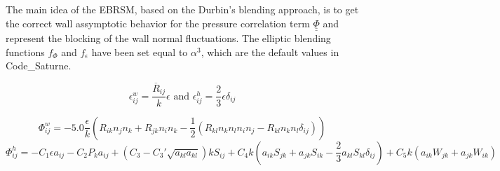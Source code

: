 \documentclass[11pt,letterpaper,english]{article}
\begin{document}
The main idea of the EBRSM, based on the Durbin's blending approach, is to get the correct wall assymptotic behavior for the pressure correlation term $\underline{\underline{\Phi}}$ and represent the blocking of the wall normal fluctuations.
The elliptic blending functions $f_{\Phi}$ and $f_{\epsilon}$\cite{manceau2015} have been set equal to $\alpha^{3}$, which are the default values in Code\_Saturne.



\begin{equation}
  \epsilon_{ij}^{w} = \frac{\overline{R}_{ij}}{k}\epsilon \text{ and } \epsilon_{ij}^{h} =\frac{2}{3} \epsilon \delta_{ij}
\end{equation}

\begin{equation}
  \Phi_{ij}^{w} = -5.0 \frac{\epsilon}{k} (R_{ik}n_{j}n_{k} + R_{jk} n_{i} n_{k} - \frac{1}{2} (R_{kl}n_{k}n_{l}n_{i}n_{j}-R_{kl}n_{k}n_{l}\delta_{ij})) 
\end{equation}
\begin{equation}
  \Phi_{ij}^{h} = -C_{1}\epsilon a_{ij} -C_{2}P_{k}a_{ij} + (C_{3} - C_{3}'\sqrt{a_{kl}a_{kl}})k S_{ij} + C_{4}k(a_{ik}S_{jk} + a_{jk}S_{ik} - \frac{2}{3} a_{kl} S_{kl} \delta_{ij}) + C_{5}k(a_{ik}W_{jk} + a_{jk}W_{ik})%
\end{equation}
\end{document}
